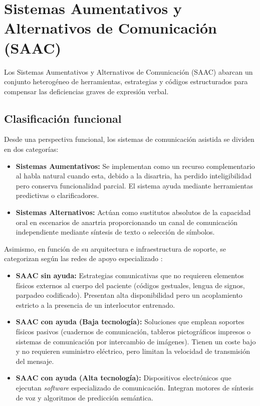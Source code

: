\section{Sistemas Aumentativos y Alternativos de Comunicación (SAAC)}
Los Sistemas Aumentativos y Alternativos de Comunicación (SAAC) abarcan un conjunto heterogéneo de herramientas, estrategias y códigos estructurados para compensar las deficiencias graves de expresión verbal.

\subsection{Clasificación funcional}
Desde una perspectiva funcional, los sistemas de comunicación asistida se dividen en dos categorías:
\begin{itemize}
   	 \item \textbf{Sistemas Aumentativos:} Se implementan como un recurso complementario al habla natural cuando esta, debido a la disartria, ha perdido inteligibilidad pero conserva funcionalidad parcial. El sistema ayuda mediante herramientas predictivas o clarificadores.
    	\item \textbf{Sistemas Alternativos:} Actúan como sustitutos absolutos de la capacidad oral en escenarios de anartria proporcionando un canal de comunicación independiente mediante síntesis de texto o selección de símbolos.
\end{itemize}

Asimismo, en función de su arquitectura e infraestructura de soporte, se categorizan según las redes de apoyo especializado \cite{alfasaac:caa}:
\begin{itemize}
    	\item \textbf{SAAC sin ayuda:} Estrategias comunicativas que no requieren elementos físicos externos al cuerpo del paciente (códigos gestuales, lengua de signos, parpadeo codificado). Presentan alta disponibilidad pero un acoplamiento estricto a la presencia de un interlocutor 			entrenado.
    	\item \textbf{SAAC con ayuda (Baja tecnología):} Soluciones que emplean soportes físicos pasivos (cuadernos de comunicación, tableros pictográficos impresos o sistemas de comunicación por intercambio de imágenes). Tienen un coste bajo y no requieren suministro eléctrico, 			pero limitan la velocidad de transmisión del mensaje.
    	\item \textbf{SAAC con ayuda (Alta tecnología):} Dispositivos electrónicos que ejecutan \textit{software} especializado de comunicación. Integran motores de síntesis de voz y algoritmos de predicción semántica.
\end{itemize}

